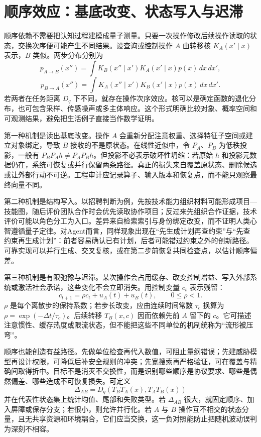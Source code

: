 \section{顺序效应：基底改变、状态写入与迟滞}
\label{sec:section_un_exchange}

顺序依赖不需要把认知过程建模成量子测量。只要一次操作修改后续操作读取的状态，交换次序便可能产生不同结果。设查询或控制操作 $A$ 由转移核 $K_A(x'\mid x)$ 表示，$B$ 类似。两步分布分别为
\[
p_{A\rightarrow B}(x'')=\int K_B(x''\mid x')K_A(x'\mid x)p(x)\,dx\,dx',
\]
\[
p_{B\rightarrow A}(x'')=\int K_A(x''\mid x')K_B(x'\mid x)p(x)\,dx\,dx'.
\]
若两者在任务距离 $D_q$ 下不同，就存在操作次序效应。核可以是确定函数的退化分布，也可包含采样、传感噪声或多主体响应。这个形式明确比较对象、概率空间和可观测结果，避免把生活例子直接当作数学证明。

第一种机制是读出基底改变。操作 $A$ 会重新分配注意权重、选择特征子空间或建立对象绑定，导致 $B$ 接收的不是原状态。在线性近似中，令 $P_A$、$P_B$ 为低秩投影，一般有 $P_BP_Ah\neq P_AP_Bh$。但投影不必表示破坏性坍缩：若原始 $h$ 和投影元数据仍在，系统可恢复或并行保留两条路径。真正的损失来自覆盖原状态、删除候选或让外部行动不可逆。工程审计应记录算子、输入版本和恢复点，而不能只观察最终向量不同。

第二种机制是结构写入。以招聘判断为例，先按技术能力组织材料可能形成项目—技能图，随后评价团队合作时会优先读取协作项目；反过来先组织合作证据，技术评价可能以角色分工为入口。差异来自检索索引与身份绑定改变，而不证明人类心智遵循量子定律。对Agent而言，同样现象出现在“先生成计划再查约束”与“先查约束再生成计划”：前者容易确认已有计划，后者可能错过约束之外的创新路径。可靠实现可以并行生成、交叉复核，或在第二步前恢复共同检查点，以估计顺序偏差。

第三种机制是有限弛豫与迟滞。某次操作会占用缓存、改变控制增益、写入外部系统或激活社会承诺，这些变化不会立即消失。用控制变量 $c_t$ 表示残留：
\[
c_{t+1}=\rho c_t+u_A(t)+u_B(t),\qquad 0\le\rho<1.
\]
$\rho$ 是每个离散步的保持系数；若步长改变，应由连续时间常数 $\tau_c$ 换算为 $\rho=\exp(-\Delta t/\tau_c)$。后续转移 $T_B(x,c)$ 因而依赖先前 $A$ 留下的 $c$。它可描述注意惯性、缓存热度或限流状态，但不能把这些不同单位的机制统称为“流形被压弯”。

顺序也能创造有益路径。先做单位检查再代入数值，可阻止量纲错误；先建威胁模型再设计权限，可降低后补安全规则的冲突；先宽搜索再严格验证，可在覆盖与精确间取得折中。目标不是消灭不交换性，而是识别哪些顺序是协议要求、哪些是偶然偏差、哪些造成不可恢复损失。可定义
\[
\Delta_{AB}=D_q(T_BT_A(x),T_AT_B(x))
\]
并在代表性状态集上统计均值、尾部和失败类型。若 $\Delta_{AB}$ 很大，就固定顺序、加入屏障或保存分支；若很小，则允许并行化。若 $A$ 与 $B$ 操作互不相交的状态分量，且无共享资源和环境耦合，它们应当交换，这一负对照能防止把随机波动误判为深刻不相容。

